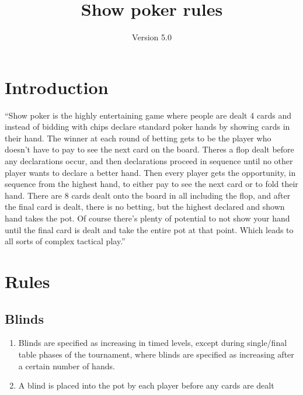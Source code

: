 \documentclass[a4paper,12pt]{article}
\title{Show poker rules}
\author{Version 5.0}
\begin{document}
\maketitle
\pagebreak
\tableofcontents

\pagebreak

\section{Introduction}
“Show poker is the highly entertaining game where people are dealt 4 cards and instead of bidding with chips declare standard poker hands by showing cards in their hand. The winner at each round of betting gets to be the player who doesn’t have to pay to see the next card on the board. Theres a flop dealt before any declarations occur, and then declarations proceed in sequence until no other player wants to declare a better hand. Then every player gets the opportunity, in sequence from the highest hand, to either pay to see the next card or to fold their hand. There are 8 cards dealt onto the board in all including the flop, and after the final card is dealt, there is no betting, but the highest declared and shown hand takes the pot. Of course there’s plenty of potential to not show your hand until the final card is dealt and take the entire pot at that point. Which leads to all sorts of complex tactical play.” 

\pagebreak
\section{Rules}
\subsection{Blinds}
\begin{enumerate}

\item
Blinds are specified as increasing in timed levels, except during single/final table phases of the tournament, where blinds are specified as increasing after a certain number of hands.
\item
A blind is placed into the pot by each player before any cards are dealt


\end{enumerate}
\end{document}
